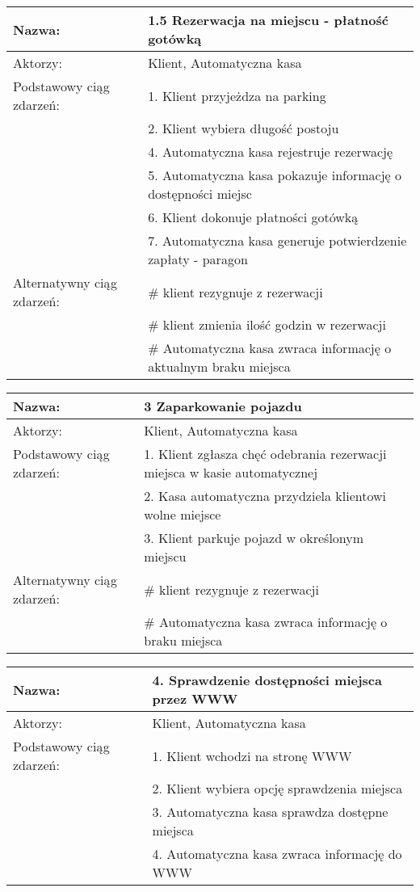 \begin{center}
\vspace{1cm}

\begin{tabular}{|L{3cm}  L{13cm}|}
\hline
Nazwa: & 1.5 Rezerwacja na miejscu - płatność gotówką \\ \hline
Aktorzy: & Klient,  Automatyczna kasa \\ \hline
Podstawowy ciąg zdarzeń: & 1. Klient przyjeżdza na parking \\
 & 2. Klient wybiera długość postoju \\
 & 4. Automatyczna kasa rejestruje rezerwację \\
 & 5. Automatyczna kasa pokazuje informację o dostępności miejsc \\
 & 6. Klient dokonuje płatności gotówką \\
 & 7. Automatyczna kasa generuje potwierdzenie zapłaty - paragon \\ \hline
Alternatywny ciąg zdarzeń:  & \# klient rezygnuje z rezerwacji \\
 & \# klient zmienia ilość godzin w rezerwacji \\
 & \# Automatyczna kasa zwraca informację o aktualnym braku miejsca\\ \hline
\end{tabular}

\vspace{1cm}

\begin{tabular}{|L{3cm}  L{13cm}|}
\hline
Nazwa: & 3 Zaparkowanie pojazdu \\ \hline
Aktorzy: & Klient,  Automatyczna kasa \\ \hline
Podstawowy ciąg zdarzeń: & 1. Klient zgłasza chęć odebrania rezerwacji miejsca w kasie automatycznej\\
 & 2. Kasa automatyczna przydziela klientowi wolne miejsce\\
 & 3. Klient parkuje pojazd w określonym miejscu\\ \hline
Alternatywny ciąg zdarzeń:  & \# klient rezygnuje z rezerwacji \\
 & \# Automatyczna kasa zwraca informację o braku miejsca\\ \hline
\end{tabular}

\vspace{1cm}

\begin{tabular}{|L{3cm}  L{13cm}|}
\hline
Nazwa: & 4. Sprawdzenie dostępności miejsca przez WWW \\ \hline
Aktorzy: & Klient,  Automatyczna kasa \\ \hline
Podstawowy ciąg zdarzeń: & 1. Klient wchodzi na stronę WWW \\
 & 2. Klient wybiera opcję sprawdzenia miejsca \\
 & 3. Automatyczna kasa sprawdza dostępne miejsca \\
 & 4. Automatyczna kasa zwraca informację do WWW \\ \hline
\end{tabular}


\end{center}
